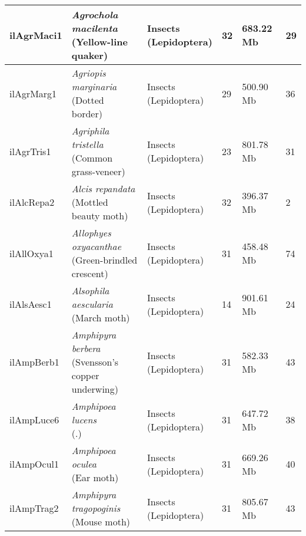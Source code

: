 \begin{centering}
\begin{longtable}{l|l|l|l|l|l}
ilAgrMaci1 & \makecell[{l}]{\textit{Agrochola macilenta} \\ (Yellow-line quaker)} & \makecell[{l}]{Insects \\ (Lepidoptera)} & 32 & 683.22 Mb & 29  \\ \hline
ilAgrMarg1 & \makecell[{l}]{\textit{Agriopis marginaria} \\ (Dotted border)} & \makecell[{l}]{Insects \\ (Lepidoptera)} & 29 & 500.90 Mb & 36  \\ \hline
ilAgrTris1 & \makecell[{l}]{\textit{Agriphila tristella} \\ (Common grass-veneer)} & \makecell[{l}]{Insects \\ (Lepidoptera)} & 23 & 801.78 Mb & 31  \\ \hline
ilAlcRepa2 & \makecell[{l}]{\textit{Alcis repandata} \\ (Mottled beauty moth)} & \makecell[{l}]{Insects \\ (Lepidoptera)} & 32 & 396.37 Mb & 2  \\ \hline
ilAllOxya1 & \makecell[{l}]{\textit{Allophyes oxyacanthae} \\ (Green-brindled crescent)} & \makecell[{l}]{Insects \\ (Lepidoptera)} & 31 & 458.48 Mb & 74  \\ \hline
ilAlsAesc1 & \makecell[{l}]{\textit{Alsophila aescularia} \\ (March moth)} & \makecell[{l}]{Insects \\ (Lepidoptera)} & 14 & 901.61 Mb & 24  \\ \hline
ilAmpBerb1 & \makecell[{l}]{\textit{Amphipyra berbera} \\ (Svensson's copper underwing)} & \makecell[{l}]{Insects \\ (Lepidoptera)} & 31 & 582.33 Mb & 43  \\ \hline
ilAmpLuce6 & \makecell[{l}]{\textit{Amphipoea lucens} \\ (.)} & \makecell[{l}]{Insects \\ (Lepidoptera)} & 31 & 647.72 Mb & 38  \\ \hline
ilAmpOcul1 & \makecell[{l}]{\textit{Amphipoea oculea} \\ (Ear moth)} & \makecell[{l}]{Insects \\ (Lepidoptera)} & 31 & 669.26 Mb & 40  \\ \hline
ilAmpTrag2 & \makecell[{l}]{\textit{Amphipyra tragopoginis} \\ (Mouse moth)} & \makecell[{l}]{Insects \\ (Lepidoptera)} & 31 & 805.67 Mb & 43  \\ \hline

\end{longtable}
\end{centering}

